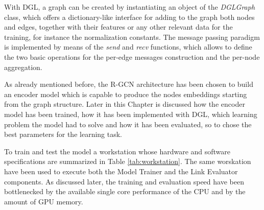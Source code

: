 \documentclass[%
    corpo=13.5pt,
    twoside,
    oldstyle,
    tipotesi=magistrale,
    greek,
    evenboxes
]{toptesi}
\begin{document}
With DGL, a graph can be created by instantiating an object of the
\emph{DGLGraph} class, which offers a dictionary-like interface for adding to
the graph both nodes and edges, together with their features or any other
relevant data for the training, for instance the normalization constants.
The message passing paradigm is implemented by means of the \emph{send} and
\emph{recv} functions, which allows to define the two basic operations for the
per-edge messages construction and the per-node aggregation.

As already mentioned before, the R-GCN architecture has been chosen to build
an encoder model which is capable to produce the nodes embeddings starting
from the graph structure.
Later in this Chapter is discussed how the encoder model has been trained, how
it has been implemented with DGL, which learning problem the model had
to solve and how it has been evaluated, so to chose the best parameters for the
learning task.
\newline

To train and test the model a workstation whose hardware and software
specifications are summarized in Table \ref{tab:workstation}.
The same worskation have been used to execute both the Model Trainer and
the Link Evaluator components.
As discussed later, the training and evaluation speed have been
bottlenecked by the available single core performance of the CPU and by the
amount of GPU memory.
\end{document}
